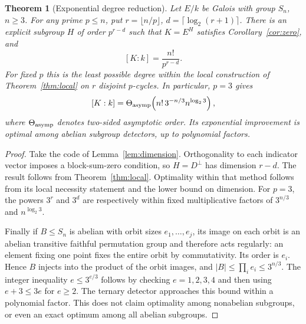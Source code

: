 \documentclass[11pt]{article}
\newtheorem{theorem}{Theorem}[section]
\theoremstyle{remark}\newtheorem{remark}[theorem]{Remark}
\begin{document}
\begin{theorem}[Exponential degree reduction]\label{thm:main}
Let $E/k$ be Galois with group $S_n$, $n\ge3$. For any prime $p\le n$, put $r=\lfloor n/p\rfloor$, $d=\lceil\log_2(r+1)\rceil$. There is an explicit subgroup $H$ of order $p^{r-d}$ such that $K=E^H$ satisfies Corollary~\ref{cor:zero}, and
\begin{equation}\label{eq:degree}
 [K:k]=\frac{n!}{p^{r-d}}.
\end{equation}
For fixed $p$ this is the least possible degree within the local construction of Theorem~\ref{thm:local} on $r$ disjoint $p$-cycles. In particular, $p=3$ gives
\[
 [K:k]=\Theta_{\rm asymp}\!\left(n!\,3^{-n/3}n^{\log_2 3}\right),
\]
where $\Theta_{\rm asymp}$ denotes two-sided asymptotic order. Its exponential improvement is optimal among abelian subgroup detectors, up to polynomial factors.
\end{theorem}
\begin{proof}
Take the code of Lemma~\ref{lem:dimension}. Orthogonality to each indicator vector imposes a block-sum-zero condition, so $H=D^\perp$ has dimension $r-d$. The result follows from Theorem~\ref{thm:local}. Optimality within that method follows from its local necessity statement and the lower bound on dimension. For $p=3$, the powers $3^r$ and $3^d$ are respectively within fixed multiplicative factors of $3^{n/3}$ and $n^{\log_2 3}$.

Finally if $B\le S_n$ is abelian with orbit sizes $e_1,\ldots,e_j$, its image on each orbit is an abelian transitive faithful permutation group and therefore acts regularly: an element fixing one point fixes the entire orbit by commutativity. Its order is $e_i$. Hence $B$ injects into the product of the orbit images, and $|B|\le\prod_i e_i\le3^{n/3}$. The integer inequality $e\le3^{e/3}$ follows by checking $e=1,2,3,4$ and then using $e+3\le3e$ for $e\ge2$. The ternary detector approaches this bound within a polynomial factor. This does not claim optimality among nonabelian subgroups, or even an exact optimum among all abelian subgroups.
\end{proof}
\end{document}
